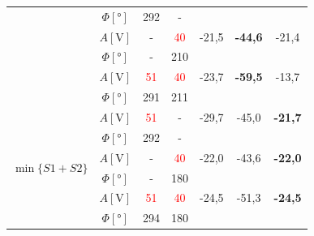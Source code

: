 \documentclass[polish,a4paper,11pt]{mwart}
\begin{document}
\begin{table}[!tbh]
\begin{tabular}{|c|c|c|c|c|c|c|}
				       &$\Phi [\si{\degree}]$ & 292 & - & \multicolumn{3}{c}{}\\\cline{2-7}
				       &   $A [\si{\V}]$ & - & \textcolor{red}{40} & -21,5 & \textbf{-44,6} & -21,4 \\\cline{2-7}
				       &$\Phi [\si{\degree}]$ & - & 210 & \multicolumn{3}{c}{}\\\cline{2-7}
				       &   $A [\si{\V}]$ & \textcolor{red}{51} & \textcolor{red}{40} & -23,7 & \textbf{-59,5} & -13,7\\\cline{2-7}
				       &$\Phi [\si{\degree}]$ & 291 & 211 & \multicolumn{3}{c}{}\\\hline
    \multirow{6}{*}{$\min\{S1+S2\}$}   &   $A [\si{\V}]$ & \textcolor{red}{51} & - & -29,7 & -45,0 & \textbf{-21,7}\\\cline{2-7}
				       &$\Phi [\si{\degree}]$ & 292 & - & \multicolumn{3}{c}{}\\\cline{2-7}
				       &   $A [\si{\V}]$ & - & \textcolor{red}{40} & -22,0 & -43,6 & \textbf{-22,0} \\\cline{2-7}
				       &$\Phi [\si{\degree}]$ & - & 180 & \multicolumn{3}{c}{}\\\cline{2-7}
				       &   $A [\si{\V}]$ & \textcolor{red}{51} & \textcolor{red}{40} & -24,5 & -51,3 & \textbf{-24,5} \\\cline{2-7}
				       &$\Phi [\si{\degree}]$ & 294 & 180 & \multicolumn{3}{c}{}\\\cline{1-4}
  \end{tabular}
\end{table}
\end{document}
